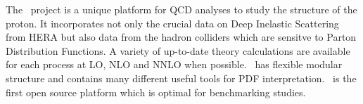 
The \fitter\ project is a unique platform for QCD analyses to study the 
structure of the proton. It incorporates not only the crucial data on
Deep Inelastic Scattering from HERA but also data from the hadron colliders 
which are sensitve to Parton Distribution Functions. A variety of up-to-date 
theory calculations are available for each process at LO, NLO and NNLO 
when possible.  
\fitter\ has flexible modular structure and contains many different useful tools for PDF interpretation. 
\fitter\ is the first open source platform which is optimal for benchmarking studies.

